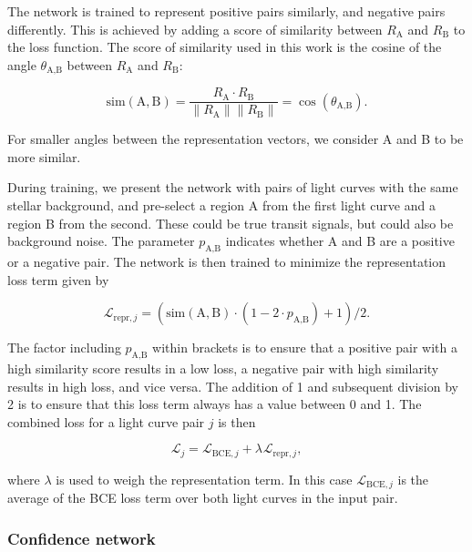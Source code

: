The network is trained to represent positive pairs similarly, and negative pairs differently. This is achieved by adding a score of similarity between $R_\text{A}$ and $R_\text{B}$ to the loss function. The score of similarity used in this work is the cosine of the angle $\theta_{\text{A}, \text{B}}$ between $R_\text{A}$ and $R_\text{B}$:

\begin{equation}
    \text{sim}(\text{A}, \text{B})  = \frac{R_\text{A} \cdot R_\text{B}}{\|R_\text{A}\|\|R_\text{B}\|} = \cos(\theta_{\text{A}, \text{B}}).
\end{equation}

\noindent For smaller angles between the representation vectors, we consider A and B to be more similar. 

During training, we present the network with pairs of light curves with the same stellar background, and pre-select a region A from the first light curve and a region B from the second. These could be true transit signals, but could also be background noise. The parameter $p_{\text{A},\text{B}}$ indicates whether A and B are a positive or a negative pair. The network is then trained to minimize the representation loss term given by

\begin{equation}
   \mathcal{L}_{\text{repr}, j} =(\text{sim}(\text{A}, \text{B}) \cdot(1 - 2 \cdot p_{\text{A},\text{B}}) + 1) / 2.
\end{equation}

\noindent The factor including $p_{\text{A},\text{B}}$ within brackets is to ensure that a positive pair with a high similarity score results in a low loss, a negative pair with high similarity results in high loss, and vice versa. The addition of 1 and subsequent division by 2 is to ensure that this loss term always has a value between 0 and 1. The combined loss for a light curve pair $j$ is then 

\begin{equation}
    \mathcal{L}_{j} = \mathcal{L}_{\text{BCE}, j} + \lambda_{} \mathcal{L}_{\text{repr}, j},
\end{equation}

\noindent where $\lambda$ is used to weigh the representation term. In this case $\mathcal{L}_{\text{BCE}, j}$ is the average of the BCE loss term over both light curves in the input pair.

\subsubsection{Confidence network}
\label{sec:extension_conf}

